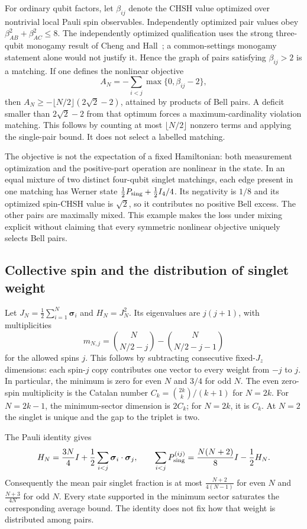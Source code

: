 For ordinary qubit factors, let $\beta_{ij}$ denote the CHSH value optimized over nontrivial local Pauli spin observables. Independently optimized pair values obey
$\beta_{AB}^2+\beta_{AC}^2\le8$. The independently optimized qualification uses the strong three-qubit monogamy result of Cheng and Hall~\cite{chenghall}; a common-settings monogamy statement alone would not justify it. Hence the graph of pairs satisfying $\beta_{ij}>2$ is a matching. If one defines the nonlinear objective
\[
 A_N=-\sum_{i<j}\max\{0,\beta_{ij}-2\},
\]
then
$A_N\ge-\lfloor N/2\rfloor(2\sqrt2-2)$, attained by products of Bell pairs. A deficit smaller than $2\sqrt2-2$ from that optimum forces a maximum-cardinality violation matching. This follows by counting at most $\lfloor N/2\rfloor$ nonzero terms and applying the single-pair bound. It does not select a labelled matching.

The objective is not the expectation of a fixed Hamiltonian: both measurement optimization and the positive-part operation are nonlinear in the state. In an equal mixture of two distinct four-qubit singlet matchings, each edge present in one matching has Werner state
$\tfrac12P_{\rm sing}+\tfrac12I_4/4$.
Its negativity is $1/8$ and its optimized spin-CHSH value is $\sqrt2$, so it contributes no positive Bell excess. The other pairs are maximally mixed. This example makes the loss under mixing explicit without claiming that every symmetric nonlinear objective uniquely selects Bell pairs.

\subsection{Collective spin and the distribution of singlet weight}
\label{qua:spin}
Let $J_N=\tfrac12\sum_{i=1}^N\boldsymbol\sigma_i$ and $H_N=J_N^2$. Its eigenvalues are $j(j+1)$, with multiplicities
\[
 m_{N,j}=\binom N{N/2-j}-\binom N{N/2-j-1}
\]
for the allowed spins $j$. This follows by subtracting consecutive fixed-$J_z$ dimensions: each spin-$j$ copy contributes one vector to every weight from $-j$ to $j$. In particular, the minimum is zero for even $N$ and $3/4$ for odd $N$. The even zero-spin multiplicity is the Catalan number $C_k=\binom{2k}k/(k+1)$ for $N=2k$. For $N=2k-1$, the minimum-sector dimension is $2C_k$; for $N=2k$, it is $C_k$. At $N=2$ the singlet is unique and the gap to the triplet is two.

The Pauli identity gives
\[
 H_N=\frac{3N}{4}I+\frac12\sum_{i<j}\boldsymbol\sigma_i\cdot\boldsymbol\sigma_j,
 \qquad
 \sum_{i<j}P_{\rm sing}^{(ij)}=\frac{N(N+2)}8I-\frac12H_N.
\]
Consequently the mean pair singlet fraction is at most
$\frac{N+2}{4(N-1)}$ for even $N$ and $\frac{N+3}{4N}$ for odd $N$. Every state supported in the minimum sector saturates the corresponding average bound. The identity does not fix how that weight is distributed among pairs.

